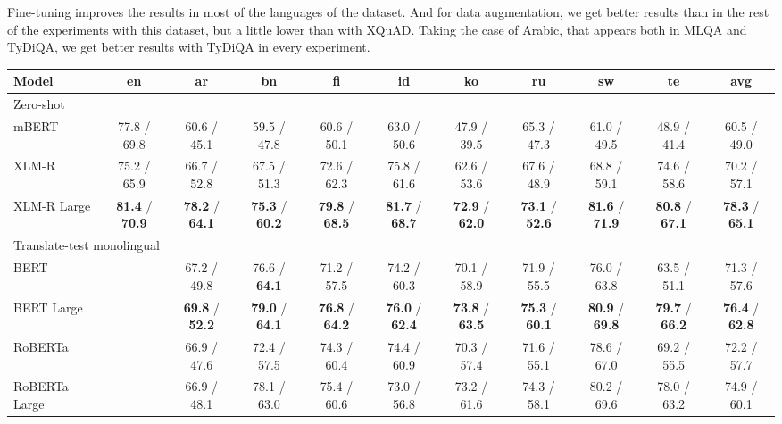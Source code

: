 \documentclass[11pt]{article}
\begin{document}
Fine-tuning improves the results in most of the languages of the dataset. And for data augmentation, we get better results than in the rest of the experiments with this dataset, but a little lower than with XQuAD. Taking the case of Arabic, that appears both in MLQA and TyDiQA, we get better results with TyDiQA in every experiment.

\begin{table*}[!ht]
    \centering
    \begin{adjustbox}{max width=\textwidth}
    \begin{tabular}{l|ccccccccc|c}
        \toprule
        Model & en & ar & bn & fi & id & ko & ru & sw & te & avg \\
        \midrule
        \multicolumn{11}{l}{Zero-shot} \\
        \midrule
        mBERT & 77.8 / 69.8 & 60.6 / 45.1 & 59.5 / 47.8 & 60.6 / 50.1 & 63.0 / 50.6 & 47.9 / 39.5 & 65.3 / 47.3 & 61.0 / 49.5 & 48.9 / 41.4 & 60.5 / 49.0  \\
        XLM-R & 75.2 / 65.9 & 66.7 / 52.8 & 67.5 / 51.3 & 72.6 / 62.3 & 75.8 / 61.6 & 62.6 / 53.6 & 67.6 / 48.9 & 68.8 / 59.1 & 74.6 / 58.6 & 70.2 / 57.1  \\
        XLM-R Large & \textbf{81.4} / \textbf{70.9} & \textbf{78.2} / \textbf{64.1} & \textbf{75.3} / \textbf{60.2} & \textbf{79.8} / \textbf{68.5} & \textbf{81.7} / \textbf{68.7} & \textbf{72.9} / \textbf{62.0} & \textbf{73.1} / \textbf{52.6} & \textbf{81.6} / \textbf{71.9} & \textbf{80.8} / \textbf{67.1} & \textbf{78.3} / \textbf{65.1}\\
        \midrule
        \multicolumn{11}{l}{Translate-test monolingual} \\
        \midrule
        BERT & ~ & 67.2 / 49.8 & 76.6 / \textbf{64.1} & 71.2 / 57.5 & 74.2 / 60.3 & 70.1 / 58.9 & 71.9 / 55.5 & 76.0 / 63.8 & 63.5 / 51.1 & 71.3 / 57.6 \\
        BERT Large & ~ & \textbf{69.8} / \textbf{52.2} & \textbf{79.0} / \textbf{64.1} & \textbf{76.8} / \textbf{64.2} & \textbf{76.0} / \textbf{62.4} & \textbf{73.8} / \textbf{63.5} & \textbf{75.3} / \textbf{60.1} & \textbf{80.9} / \textbf{69.8} & \textbf{79.7} / \textbf{66.2} & \textbf{76.4} / \textbf{62.8} \\
        RoBERTa & ~ & 66.9 / 47.6 & 72.4 / 57.5 & 74.3 / 60.4 & 74.4 / 60.9 & 70.3 / 57.4 & 71.6 / 55.1 & 78.6 / 67.0 & 69.2 / 55.5 & 72.2 / 57.7 \\
        RoBERTa Large & ~ & 66.9 / 48.1 & 78.1 / 63.0 & 75.4 / 60.6 & 73.0 / 56.8 & 73.2 / 61.6 & 74.3 / 58.1 & 80.2 / 69.6 & 78.0 / 63.2 & 74.9 / 60.1\\

\end{tabular}
\end{adjustbox}
\end{table*}
\end{document}
